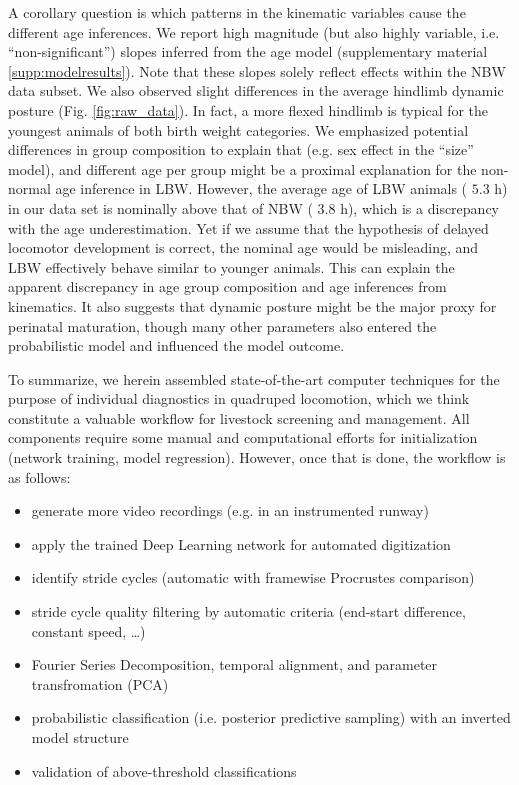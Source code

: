 \documentclass[10pt,a4paper]{article}
\begin{document}
\bigskip
\pagebreak
A corollary question is which patterns in the kinematic variables cause the different age inferences.
We report high magnitude (but also highly variable, i.e. ``non-significant'') slopes inferred from the age model (supplementary material \ref{supp:modelresults}).
Note that these slopes solely reflect effects within the NBW data subset.
We also observed slight differences in the average hindlimb dynamic posture (Fig. \ref{fig:raw_data}).
In fact, a more flexed hindlimb is typical for the youngest animals of both birth weight categories.
We emphasized potential differences in group composition to explain that (e.g. sex effect in the ``size'' model), and different age per group might be a proximal explanation for the non-normal age inference in LBW.
However, the average age of LBW animals (
\(5.3\) h) in our data set is nominally above that of NBW (
\(3.8\)
h), which is a discrepancy with the age underestimation.
Yet if we assume that the hypothesis of delayed locomotor development is correct, the nominal age would be misleading, and LBW effectively behave similar to younger animals.
This can explain the apparent discrepancy in age group composition and age inferences from kinematics.
It also suggests that dynamic posture might be the major proxy for perinatal maturation, though many other parameters also entered the probabilistic model and influenced the model outcome.


\bigskip
To summarize, we herein assembled state-of-the-art computer techniques for the purpose of individual diagnostics in quadruped locomotion, which we think constitute a valuable workflow for livestock screening and management.
All components require some manual and computational efforts for initialization (network training, model regression).
However, once that is done, the workflow is as follows:
\begin{itemize}
\item generate more video recordings (e.g. in an instrumented runway)
\item apply the trained Deep Learning network for automated digitization
\item identify stride cycles (automatic with framewise Procrustes comparison)
\item stride cycle quality filtering by automatic criteria (end-start difference, constant speed, \ldots{})
\item Fourier Series Decomposition, temporal alignment, and parameter transfromation (PCA)
\item probabilistic classification (i.e. posterior predictive sampling) with an inverted model structure
\item validation of above-threshold classifications
\end{itemize}
\end{document}

